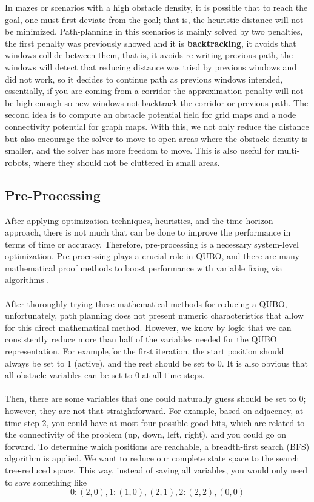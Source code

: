 \documentclass[11pt]{article}
\begin{document}
In mazes or scenarios with a high obstacle density, it is possible that to reach the goal, one must first deviate from the goal; that is, the heuristic distance will not be minimized. Path-planning in this scenarios is mainly solved by two penalties, the first penalty was previously showed and it is \textbf{backtracking}, it avoids that windows collide between them, that is, it avoids re-writing previous path, the windows will detect that reducing distance was tried by previous windows and did not work, so it decides to continue path as previous windows intended, essentially, if you are coming from a corridor the approximation penalty will not be high enough so new windows not backtrack the corridor or previous path. The second idea is to compute an obstacle potential field for grid maps and a node connectivity potential for graph maps. With this, we not only reduce the distance but also encourage the solver to move to open areas where the obstacle density is smaller, and the solver has more freedom to move. This is also useful for multi-robots, where they should not be cluttered in small areas.

\subsection{Pre-Processing}

After applying optimization techniques, heuristics, and the time horizon approach, there is not much that can be done to improve the performance in terms of time or accuracy. Therefore, pre-processing is a necessary system-level optimization. Pre-processing plays a crucial role in QUBO, and there are many mathematical proof methods to boost performance with variable fixing via algorithms \cite{Pre-process1} \cite{Pre-process2}.\\
\\
After thoroughly trying these mathematical methods for reducing a QUBO, unfortunately, path planning does not present numeric characteristics that allow for this direct mathematical method. However, we know by logic that we can consistently reduce more than half of the variables needed for the QUBO representation.  For example,for the first iteration, the start position should always be set to 1 (active), and the rest should be set to 0. It is also obvious that all obstacle variables can be set to 0 at all time steps.\\
\\
Then, there are some variables that one could naturally guess should be set to 0; however, they are not that straightforward. For example, based on adjacency, at time step 2, you could have at most four possible good bits, which are related to the connectivity of the problem (up, down, left, right), and you could go on forward. To determine which positions are reachable, a breadth-first search (BFS) algorithm is applied. We want to reduce our complete state space to the search tree-reduced space. This way, instead of saving all variables, you would only need to save something like $$ 0: (2, 0), 1: (1, 0), (2, 1), 2: (2, 2), (0, 0) $$
\end{document}
